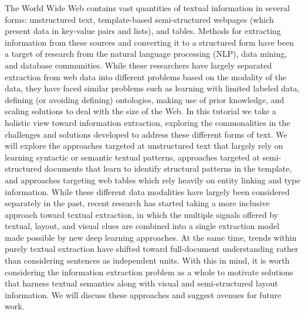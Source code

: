 The World Wide Web contains vast quantities of textual information in several forms: unstructured text, template-based semi-structured webpages (which present data in key-value pairs and lists), and tables. Methods for extracting information from these sources and converting it to a structured form have been a target of research from the natural language processing (NLP), data mining, and database communities. While these researchers have largely separated extraction from web data into different problems based on the modality of the data, they have faced similar problems such as learning with limited labeled data, defining (or avoiding defining) ontologies, making use of prior knowledge, and scaling solutions to deal with the size of the Web. In this tutorial we take a holistic view toward information extraction, exploring the commonalities in the challenges and solutions developed to address these different forms of text. We will explore the approaches targeted at unstructured text that largely rely on learning syntactic or semantic textual patterns, approaches targeted at semi-structured documents that learn to identify structural patterns in the template, and approaches targeting web tables which rely heavily on entity linking and type information. While these different data modalities have largely been considered separately in the past, recent research has started taking a more inclusive approach toward textual extraction, in which the multiple signals offered by textual, layout, and visual clues are combined into a single extraction model made possible by new deep learning approaches. At the same time, trends within purely textual extraction have shifted toward full-document understanding rather than considering sentences as independent units. With this in mind, it is worth considering the information extraction problem as a whole to motivate solutions that harness textual semantics along with visual and semi-structured layout information. We will discuss these approaches and suggest avenues for future work.
